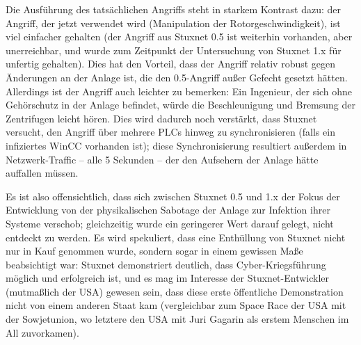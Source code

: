 \documentclass[a4paper]{article}
\begin{document}
Die Ausführung des tatsächlichen Angriffs steht in starkem Kontrast dazu:
der Angriff, der jetzt verwendet wird (Manipulation der Rotorgeschwindigkeit),
ist viel einfacher gehalten (der Angriff aus Stuxnet 0.5 ist weiterhin vorhanden, aber unerreichbar, und wurde zum Zeitpunkt der Untersuchung von Stuxnet 1.x für unfertig gehalten\cite{dossier}).
Dies hat den Vorteil, dass der Angriff relativ robust gegen Änderungen an der Anlage ist, die den 0.5-Angriff außer Gefecht gesetzt hätten.
Allerdings ist der Angriff auch leichter zu bemerken:
Ein Ingenieur, der sich ohne Gehörschutz in der Anlage befindet, würde die Beschleunigung und Bremsung der Zentrifugen leicht hören.
Dies wird dadurch noch verstärkt, dass Stuxnet versucht, den Angriff über mehrere PLCs hinweg zu synchronisieren
(falls ein infiziertes WinCC vorhanden ist);
diese Synchronisierung resultiert außerdem in Netzwerk-Traffic – alle 5 Sekunden – der den Aufsehern der Anlage hätte auffallen müssen.

Es ist also offensichtlich, dass sich zwischen Stuxnet 0.5 und 1.x der Fokus der Entwicklung
von der physikalischen Sabotage der Anlage zur Infektion ihrer Systeme verschob;
gleichzeitig wurde ein geringerer Wert darauf gelegt, nicht entdeckt zu werden.
Es wird spekuliert, dass eine Enthüllung von Stuxnet nicht nur in Kauf genommen wurde,
sondern sogar in einem gewissen Maße beabsichtigt war:
Stuxnet demonstriert deutlich, dass Cyber-Kriegsführung möglich und erfolgreich ist,
und es mag im Interesse der Stuxnet-Entwickler (mutmaßlich der USA) gewesen sein,
dass diese erste öffentliche Demonstration nicht von einem anderen Staat kam
(vergleichbar zum Space Race der USA mit der Sowjetunion,
wo letztere den USA mit Juri Gagarin als erstem Menschen im All zuvorkamen). %



\end{document}
